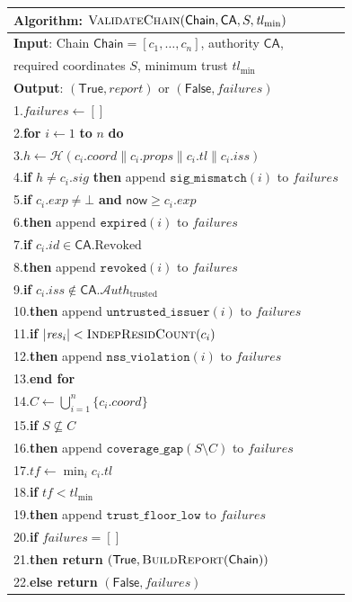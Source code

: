 \documentclass[11pt]{article}
\newcommand{\Chain}{\mathsf{Chain}}            %
\newcommand{\CA}{\mathsf{CA}}                  %
\newcommand{\certid}{\mathit{id}}              %
\newcommand{\certcoord}{\mathit{coord}}        %
\newcommand{\certprops}{\mathit{props}}        %
\newcommand{\certtrust}{\mathit{tl}}           %
\newcommand{\certissuer}{\mathit{iss}}         %
\newcommand{\certsig}{\mathit{sig}}            %
\newcommand{\certresid}{\mathit{res}}          %
\newcommand{\certexpiry}{\mathit{exp}}         %
\newcommand{\Revoked}{\mathrm{Revoked}}        %
\newcommand{\Sigalg}{\mathcal{H}}              %
\newcommand{\AuthSet}{\mathcal{A}\!\mathit{uth}} %
\begin{document}
\begin{center}
\begin{tabular}{l}
\toprule
\textbf{Algorithm}: $\textsc{ValidateChain}(\Chain, \CA, S, \certtrust_{\min})$ \\
\midrule
\textbf{Input}: Chain $\Chain = [c_1, \ldots, c_n]$, authority $\CA$, \\
\quad required coordinates $S$, minimum trust $\certtrust_{\min}$ \\
\textbf{Output}: $(\mathsf{True}, \mathit{report})$ or $(\mathsf{False}, \mathit{failures})$ \\
\midrule
1.\quad $\mathit{failures} \gets []$ \\
2.\quad \textbf{for} $i \gets 1$ \textbf{to} $n$ \textbf{do} \\
3.\quad\quad $h \gets \Sigalg(c_i.\certcoord \| c_i.\certprops \| c_i.\certtrust \| c_i.\certissuer)$ \\
4.\quad\quad \textbf{if} $h \ne c_i.\certsig$ \textbf{then} append $\mathtt{sig\_mismatch}(i)$ to $\mathit{failures}$ \\
5.\quad\quad \textbf{if} $c_i.\certexpiry \ne \bot$ \textbf{and} $\mathsf{now} \ge c_i.\certexpiry$ \\
6.\quad\quad\quad \textbf{then} append $\mathtt{expired}(i)$ to $\mathit{failures}$ \\
7.\quad\quad \textbf{if} $c_i.\certid \in \CA.\Revoked$ \\
8.\quad\quad\quad \textbf{then} append $\mathtt{revoked}(i)$ to $\mathit{failures}$ \\
9.\quad\quad \textbf{if} $c_i.\certissuer \notin \CA.\AuthSet_{\mathrm{trusted}}$ \\
10.\quad\quad\quad \textbf{then} append $\mathtt{untrusted\_issuer}(i)$ to $\mathit{failures}$ \\
11.\quad\quad \textbf{if} $|\certresid_i| < \textsc{IndepResidCount}(c_i)$ \\
12.\quad\quad\quad \textbf{then} append $\mathtt{nss\_violation}(i)$ to $\mathit{failures}$ \\
13.\quad \textbf{end for} \\
14.\quad $C \gets \bigcup_{i=1}^{n} \{c_i.\certcoord\}$ \\
15.\quad \textbf{if} $S \not\subseteq C$ \\
16.\quad\quad \textbf{then} append $\mathtt{coverage\_gap}(S \setminus C)$ to $\mathit{failures}$ \\
17.\quad $\mathit{tf} \gets \min_{i} c_i.\certtrust$ \\
18.\quad \textbf{if} $\mathit{tf} < \certtrust_{\min}$ \\
19.\quad\quad \textbf{then} append $\mathtt{trust\_floor\_low}$ to $\mathit{failures}$ \\
20.\quad \textbf{if} $\mathit{failures} = []$ \\
21.\quad\quad \textbf{then return} $(\mathsf{True}, \textsc{BuildReport}(\Chain))$ \\
22.\quad \textbf{else return} $(\mathsf{False}, \mathit{failures})$ \\
\bottomrule
\end{tabular}
\end{center}
\end{document}
